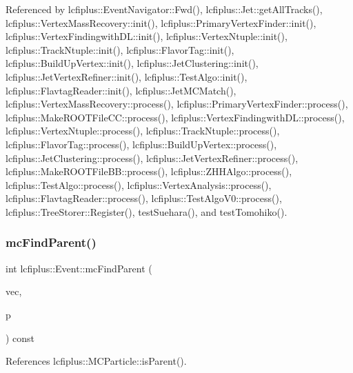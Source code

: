 Referenced by lcfiplus\+::\+Event\+Navigator\+::\+Fwd(), lcfiplus\+::\+Jet\+::get\+All\+Tracks(), lcfiplus\+::\+Vertex\+Mass\+Recovery\+::init(), lcfiplus\+::\+Primary\+Vertex\+Finder\+::init(), lcfiplus\+::\+Vertex\+Findingwith\+D\+L\+::init(), lcfiplus\+::\+Vertex\+Ntuple\+::init(), lcfiplus\+::\+Track\+Ntuple\+::init(), lcfiplus\+::\+Flavor\+Tag\+::init(), lcfiplus\+::\+Build\+Up\+Vertex\+::init(), lcfiplus\+::\+Jet\+Clustering\+::init(), lcfiplus\+::\+Jet\+Vertex\+Refiner\+::init(), lcfiplus\+::\+Test\+Algo\+::init(), lcfiplus\+::\+Flavtag\+Reader\+::init(), lcfiplus\+::\+Jet\+M\+C\+Match(), lcfiplus\+::\+Vertex\+Mass\+Recovery\+::process(), lcfiplus\+::\+Primary\+Vertex\+Finder\+::process(), lcfiplus\+::\+Make\+R\+O\+O\+T\+File\+C\+C\+::process(), lcfiplus\+::\+Vertex\+Findingwith\+D\+L\+::process(), lcfiplus\+::\+Vertex\+Ntuple\+::process(), lcfiplus\+::\+Track\+Ntuple\+::process(), lcfiplus\+::\+Flavor\+Tag\+::process(), lcfiplus\+::\+Build\+Up\+Vertex\+::process(), lcfiplus\+::\+Jet\+Clustering\+::process(), lcfiplus\+::\+Jet\+Vertex\+Refiner\+::process(), lcfiplus\+::\+Make\+R\+O\+O\+T\+File\+B\+B\+::process(), lcfiplus\+::\+Z\+H\+H\+Algo\+::process(), lcfiplus\+::\+Test\+Algo\+::process(), lcfiplus\+::\+Vertex\+Analysis\+::process(), lcfiplus\+::\+Flavtag\+Reader\+::process(), lcfiplus\+::\+Test\+Algo\+V0\+::process(), lcfiplus\+::\+Tree\+Storer\+::\+Register(), test\+Suehara(), and test\+Tomohiko().

\mbox{\label{classlcfiplus_1_1Event_a506aa0b852dc9af66217407ffa01a874}} 
\subsubsection{mc\+Find\+Parent()}
{\footnotesize\ttfamily int lcfiplus\+::\+Event\+::mc\+Find\+Parent (\begin{DoxyParamCaption}\item[{\textbf{ M\+C\+Particle\+Vec} \&}]{vec,  }\item[{const \textbf{ M\+C\+Particle} $\ast$}]{p }\end{DoxyParamCaption}) const}



References lcfiplus\+::\+M\+C\+Particle\+::is\+Parent().

\mbox{\label{classlcfiplus_1_1Event_abcfaa8eb8507d984ed68b08e6292ee9a}} 
